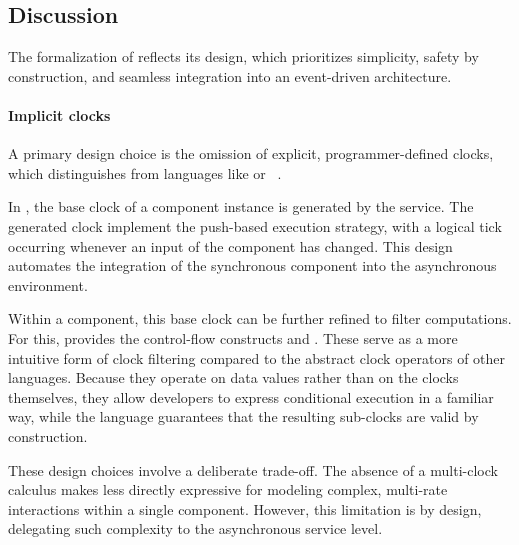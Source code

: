 











\subsection{Discussion}
\label{sec:grsync:discussion}

The formalization of \GRSync reflects its design, which prioritizes simplicity, safety by
construction, and seamless integration into an event-driven architecture.

\paragraph{Implicit clocks}
A primary design choice is the omission of explicit, programmer-defined clocks, which distinguishes
\GRSync from languages like \Lustre or
\Signal~\cite{DBLP:conf/emsoft/ColacoP03,DBLP:conf/cdc/BenvenisteBGBGM01}.

In \GRust, the base clock of a component instance is generated by the \GRFRP service. The generated
clock implement the push-based execution strategy, with a logical tick occurring whenever an input
of the component has changed. This design automates the integration of the synchronous component
into the asynchronous environment.

Within a component, this base clock can be further refined to filter computations. For this, \GRSync
provides the control-flow constructs  and . These serve as a more intuitive
form of clock filtering compared to the abstract clock operators of other languages. Because they
operate on data values rather than on the clocks themselves, they allow developers to express
conditional execution in a familiar way, while the language guarantees that the resulting sub-clocks
are valid by construction.

These design choices involve a deliberate trade-off. The absence of a multi-clock calculus makes
\GRSync less directly expressive for modeling complex, multi-rate interactions within a single
component. However, this limitation is by design, delegating such complexity to the asynchronous
\GRFRP service level.

